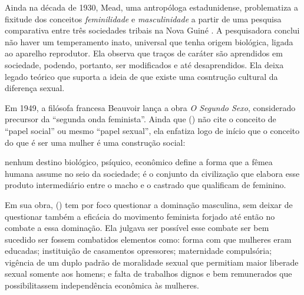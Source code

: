 Ainda na década de 1930, Mead, uma antropóloga estadunidense, problematiza a fixitude dos conceitos \emph{feminilidade} e \emph{masculinidade} a partir de uma pesquisa comparativa entre três sociedades tribais na Nova Guiné  \cite{MEAD2000}. A pesquisadora conclui não haver um temperamento inato, universal que tenha origem biológica, ligada ao aparelho reprodutor. Ela observa que traços de caráter são aprendidos em sociedade, podendo, portanto, ser modificados e até desaprendidos. Ela deixa legado teórico que suporta a ideia de que existe uma cosntrução cultural da diferença sexual.

Em 1949, a filósofa francesa Beauvoir lança a obra \emph{O Segundo Sexo}, considerado precursor da ``segunda onda feminista''\cite{PISCITELLI2009}. Ainda que  (\citeyear{BEAUVOIR1967}) não cite o conceito de  ``papel social'' ou mesmo ``papel sexual'', ela enfatiza logo de início que o conceito do que é ser uma mulher é uma construção social:

\begin{citacao}
nenhum destino biológico, psíquico, econômico define a forma que a fêmea humana assume no seio da sociedade; é o conjunto da civilização que elabora esse produto intermediário entre o macho e o castrado que qualificam de feminino.
\cite[p.09]{BEAUVOIR1967}
\end{citacao}

Em sua obra,  (\citeyear{BEAUVOIR1967}) tem por foco questionar a dominação masculina, sem deixar de questionar também a eficácia do movimento feminista forjado até então no combate a essa dominação. Ela julgava ser possível esse combate ser bem sucedido ser fossem combatidos elementos como: forma com que mulheres eram educadas; instituição de casamentos opressores; maternidade compulsória; vigência de um duplo padrão de moralidade sexual que permitiam maior liberade sexual somente aos homens; e falta de trabalhos dignos e bem remunerados que possibilitassem independência econômica às mulheres. 

